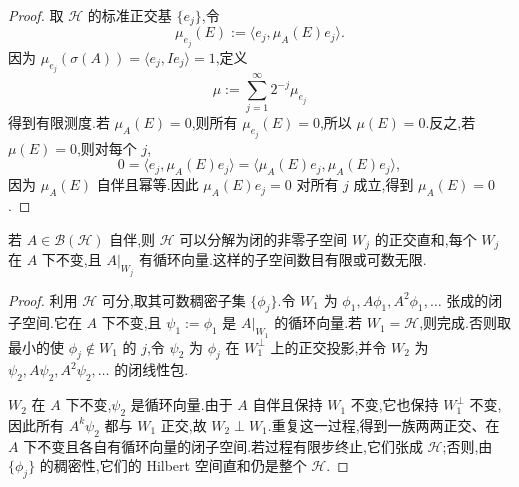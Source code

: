 \begin{proof}
取 \(\mathcal{H}\) 的标准正交基 \(\{e_{j}\}\),令
\[
\mu_{e_{j}}(E):=\langle e_{j},\mu_{A}(E)e_{j}\rangle.
\]
因为 \(\mu_{e_{j}}(\sigma(A))=\langle e_{j},Ie_{j}\rangle=1\),定义
\[
\mu:=\sum_{j=1}^{\infty}2^{-j}\mu_{e_{j}}
\]
得到有限测度.若 \(\mu_{A}(E)=0\),则所有 \(\mu_{e_{j}}(E)=0\),所以 \(\mu(E)=0\).反之,若 \(\mu(E)=0\),则对每个 \(j\),
\[
0=\langle e_{j},\mu_{A}(E)e_{j}\rangle
=\langle\mu_{A}(E)e_{j},\mu_{A}(E)e_{j}\rangle,
\]
因为 \(\mu_{A}(E)\) 自伴且幂等.因此 \(\mu_{A}(E)e_{j}=0\) 对所有 \(j\) 成立,得到 \(\mu_{A}(E)=0\).
\end{proof}

\begin{lemma}[循环子空间分解]\label{lem:cyclic-decomposition}
若 \(A\in\mathcal{B}(\mathcal{H})\) 自伴,则 \(\mathcal{H}\) 可以分解为闭的非零子空间 \(W_{j}\) 的正交直和,每个 \(W_{j}\) 在 \(A\) 下不变,且 \(A|_{W_{j}}\) 有循环向量.这样的子空间数目有限或可数无限.
\end{lemma}

\begin{proof}
利用 \(\mathcal{H}\) 可分,取其可数稠密子集 \(\{\phi_{j}\}\).令 \(W_{1}\) 为 \(\phi_{1},A\phi_{1},A^{2}\phi_{1},\ldots\) 张成的闭子空间.它在 \(A\) 下不变,且 \(\psi_{1}:=\phi_{1}\) 是 \(A|_{W_{1}}\) 的循环向量.若 \(W_{1}=\mathcal{H}\),则完成.否则取最小的使 \(\phi_{j}\notin W_{1}\) 的 \(j\),令 \(\psi_{2}\) 为 \(\phi_{j}\) 在 \(W_{1}^{\perp}\) 上的正交投影,并令 \(W_{2}\) 为 \(\psi_{2},A\psi_{2},A^{2}\psi_{2},\ldots\) 的闭线性包.

\(W_{2}\) 在 \(A\) 下不变,\(\psi_{2}\) 是循环向量.由于 \(A\) 自伴且保持 \(W_{1}\) 不变,它也保持 \(W_{1}^{\perp}\) 不变,因此所有 \(A^{k}\psi_{2}\) 都与 \(W_{1}\) 正交,故 \(W_{2}\perp W_{1}\).重复这一过程,得到一族两两正交、在 \(A\) 下不变且各自有循环向量的闭子空间.若过程有限步终止,它们张成 \(\mathcal{H}\);否则,由 \(\{\phi_{j}\}\) 的稠密性,它们的 Hilbert 空间直和仍是整个 \(\mathcal{H}\).
\end{proof}

